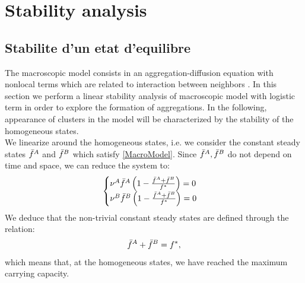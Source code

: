 \section{Stability analysis}

\subsection{Stabilite d'un etat d'equilibre}

The macroscopic model consists in an aggregation-diffusion equation with nonlocal terms which are related to interaction between neighbors .
In this section we perform a linear stability analysis of macroscopic model with logistic term in order to explore the formation of aggregations. In the following, appearance of clusters in the model will be characterized by the stability of the homogeneous states. \\
We linearize around the homogeneous states, i.e. we consider the constant steady states ${\bar{f}^A}$ and ${\bar{f}^B}$ which satisfy \eqref{MacroModel}. 
% 
Since ${\bar{f}^A},{\bar{f}^B}$ do not depend on time and space, we can reduce the system to:%
\begin{equation}
\begin{cases}
	\nu^{A}{\bar{f}^A}\left( 1-\frac{{\bar{f}^A}+{\bar{f}^B}}{f^{*}} \right)=0 \\
	\nu^{B}{\bar{f}^B}\left( 1-\frac{{\bar{f}^A}+{\bar{f}^B}}{f^{*}} \right)=0
\end{cases}
\end{equation}
We deduce that the non-trivial constant steady states are defined through the relation:
\begin{equation}
 {\bar{f}^A}+{\bar{f}^B}=f^*,
\end{equation}
which means that, at the homogeneous states, we have reached the maximum carrying capacity. 

